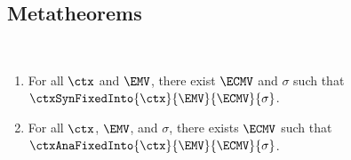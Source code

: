 


\subsection{Metatheorems}
\label{sec:marked-metatheorems}
\begin{theorem}[name=Marking Totality] \
  \begin{enumerate}
    \item For all $\ctx$ and $\EMV$, there exist $\ECMV$ and $\sigma$ such that
      $\ctxSynFixedInto{\ctx}{\EMV}{\ECMV}{\sigma}$.
    \item For all $\ctx$, $\EMV$, and $\sigma$, there exists $\ECMV$ such that
      $\ctxAnaFixedInto{\ctx}{\EMV}{\ECMV}{\sigma}$.
  \end{enumerate}
\end{theorem}

